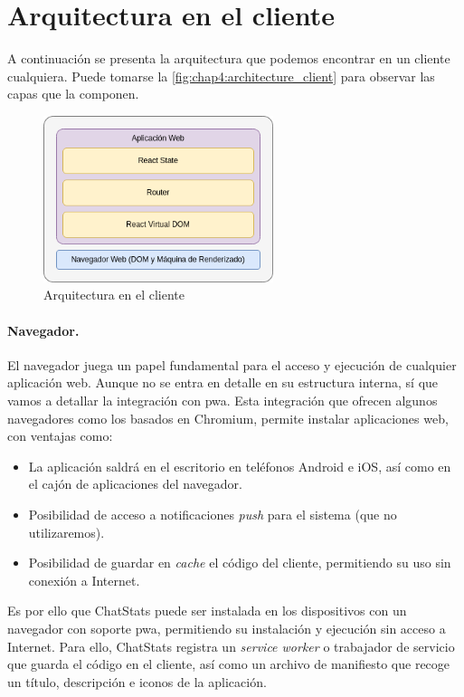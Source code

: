 \section{Arquitectura en el cliente}

A continuación se presenta la arquitectura que podemos encontrar en un cliente cualquiera. Puede tomarse la \autoref{fig:chap4:architecture_client} para observar las capas que la componen.

\begin{figure}[h]
	\centering
	\includegraphics[width=0.6\textwidth]{img/client.png}
	\caption{Arquitectura en el cliente}
	\label{fig:chap4:architecture_client}
\end{figure}

\paragraph{Navegador.} El navegador juega un papel fundamental para el acceso y ejecución de cualquier aplicación web. Aunque no se entra en detalle en su estructura interna, sí que vamos a detallar la integración con \acrfull{pwa}. Esta integración que ofrecen algunos navegadores como los basados en Chromium, permite instalar aplicaciones web, con ventajas como:

\begin{itemize}
	\item La aplicación saldrá en el escritorio en teléfonos Android e iOS, así como en el cajón de aplicaciones del navegador.
	\item Posibilidad de acceso a notificaciones \textit{push} para el sistema (que no utilizaremos).
	\item Posibilidad de guardar en \textit{cache} el código del cliente, permitiendo su uso sin conexión a Internet.
\end{itemize}

Es por ello que ChatStats puede ser instalada en los dispositivos con un navegador con soporte \acrshort{pwa}, permitiendo su instalación y ejecución sin acceso a Internet. Para ello, ChatStats registra un \textit{service worker} o trabajador de servicio que guarda el código en el cliente, así como un archivo de manifiesto que recoge un título, descripción e iconos de la aplicación.

